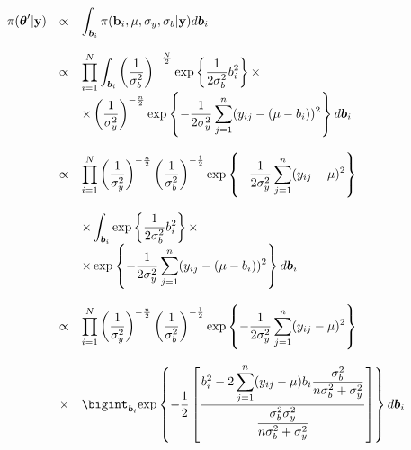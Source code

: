 \documentclass{asaproc}
\begin{document}
\begin{small}
\begin{eqnarray*}
\begin{array}{lcl ll }
\pi(\boldsymbol{\theta}'|\textbf{y}) & \propto &  \displaystyle\int_{\boldsymbol{b}_i} \pi(\textbf{b}_i, \mu, \sigma_y, \sigma_b|\textbf{y}) d\boldsymbol{b}_i \\ \\

& \propto & \displaystyle\prod_{i=1}^{N}\displaystyle\int_{\boldsymbol{b}_i} \left(\dfrac{1}{\sigma_b^2}\right)^{-\frac{N}{2}}\mbox{exp}\left\{ \dfrac{1}{2\sigma_b^2} b_i^2 \right\} \times \\ 
&  & \times  \left(\dfrac{1}{\sigma_y^2}\right)^{-\frac{n}{2}} \mbox{exp}\left\{ -\dfrac{1}{2\sigma_y^2}\displaystyle\sum_{j=1}^{n}(y_{ij} - (\mu - b_i))^2\right\} d\boldsymbol{b}_i \\\\

& \propto & \displaystyle\prod_{i=1}^{N} \left(\dfrac{1}{\sigma_y^2}\right)^{-\frac{n}{2}} \left(\dfrac{1}{\sigma_b^2}\right)^{-\frac{1}{2}} \mbox{exp}\left\{ -\dfrac{1}{2\sigma_y^2}\displaystyle\sum_{j=1}^{n}(y_{ij} - \mu)^2\right\} \\\\

& & \times \displaystyle\int_{\boldsymbol{b}_i} \mbox{exp}\left\{ \dfrac{1}{2\sigma_b^2} b_i^2 \right\} \times \\ 

&   & \times  \exp\left\{ -\dfrac{1}{2\sigma_y^2}\displaystyle\sum_{j=1}^{n}(y_{ij} - (\mu - b_i))^2\right\} d\boldsymbol{b}_i \\\\

& \propto & \displaystyle\prod_{i=1}^{N} \left(\dfrac{1}{\sigma_y^2}\right)^{-\frac{n}{2}} \left(\dfrac{1}{\sigma_b^2}\right)^{-\frac{1}{2}} \mbox{exp}\left\{ -\dfrac{1}{2\sigma_y^2}\displaystyle\sum_{j=1}^{n}(y_{ij} - \mu)^2\right\} \\\\

& \times &  \bigint_{\boldsymbol{b}_i} \mbox{exp}\left\{ -\dfrac{1}{2} \left[ \dfrac{b_i^2 - 2\displaystyle\sum_{j=1}^{n}(y_{ij} -\mu)b_i \dfrac{\sigma_b^2}{n\sigma_b^2 + \sigma_y^2}}{\dfrac{\sigma_b^2\sigma_y^2}{n\sigma_b^2 + \sigma_y^2}}\right]\right\} d\boldsymbol{b}_i \\\\

\end{array}
\end{eqnarray*}
\end{small}
\end{document}
